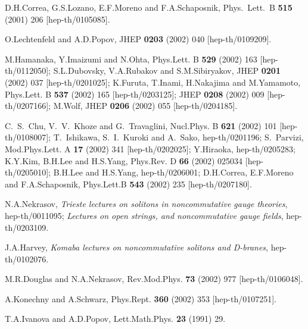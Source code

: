 \documentclass[a4paper,11pt]{article}
\numberwithin{equation}{section}
\begin{document}
\begin{thebibliography}{99}
D.H.Correa, G.S.Lozano, E.F.Moreno and F.A.Schaposnik,
Phys.\ Lett.\ B {\bf 515} (2001) 206 [hep-th/0105085].


O.Lechtenfeld and A.D.Popov,
JHEP {\bf 0203} (2002) 040 [hep-th/0109209].


M.Hamanaka, Y.Imaizumi and N.Ohta,
Phys.Lett. B {\bf 529} (2002) 163
[hep-th/0112050];
S.L.Dubovsky, V.A.Rubakov and S.M.Sibiryakov,
JHEP {\bf 0201} (2002) 037
[hep-th/0201025];
K.Furuta, T.Inami, H.Nakajima and M.Yamamoto,
Phys.Lett. B {\bf 537} (2002) 165
[hep-th/0203125];
JHEP {\bf 0208} (2002) 009
[hep-th/0207166];
M.Wolf,
JHEP {\bf 0206} (2002) 055 [hep-th/0204185].


C.~S.~Chu, V.~V.~Khoze and G.~Travaglini,
Nucl.Phys. B {\bf 621} (2002) 101
[hep-th/0108007];
T.~Ishikawa, S.~I.~Kuroki and A.~Sako,
hep-th/0201196;
S.~Parvizi,
Mod.Phys.Lett. A {\bf 17} (2002) 341 [hep-th/0202025];
Y.Hiraoka,
hep-th/0205283;
K.Y.Kim, B.H.Lee and H.S.Yang,
Phys.Rev. D {\bf 66} (2002) 025034 [hep-th/0205010];
B.H.Lee and H.S.Yang,
hep-th/0206001;
D.H.Correa, E.F.Moreno and F.A.Schaposnik,
Phys.Lett.B {\bf 543} (2002) 235 [hep-th/0207180].

N.A.Nekrasov,
{\em Trieste lectures on solitons in noncommutative gauge theories},
hep-th/0011095;
{\em Lectures on open strings, and noncommutative gauge fields},
hep-th/0203109.

J.A.Harvey,
{\em Komaba lectures on noncommutative solitons and D-branes}, hep-th/0102076.

M.R.Douglas and N.A.Nekrasov,
Rev.Mod.Phys. {\bf 73} (2002) 977 [hep-th/0106048].

A.Konechny and A.Schwarz, 
Phys.Rept. {\bf 360} (2002) 353	 [hep-th/0107251].

T.A.Ivanova and A.D.Popov,
Lett.Math.Phys. {\bf 23} (1991) 29.


\end{thebibliography}
\end{document}
